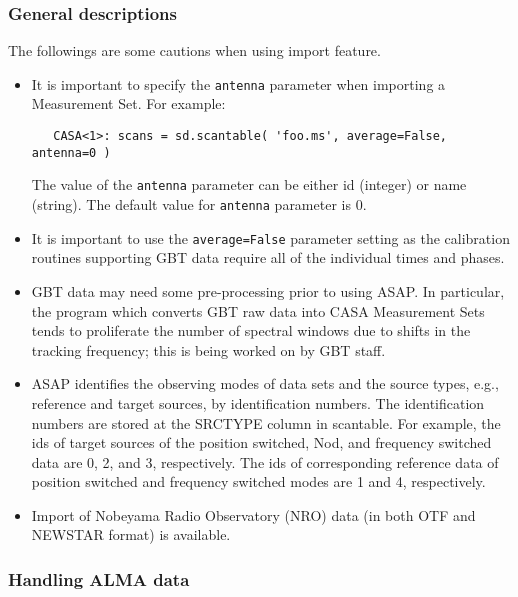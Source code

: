 \subsubsection{General descriptions}
\label{subsubsection:sd.asap.import.gen}

The followings are some cautions when using import feature.

\begin{itemize}

\item It is important to specify the {\tt antenna} parameter when importing a Measurement Set.
 For example:

\begin{verbatim}
   CASA<1>: scans = sd.scantable( 'foo.ms', average=False, antenna=0 )
\end{verbatim}
 
 The value of the {\tt antenna} parameter can be either id (integer) or name
 (string). The default value for {\tt antenna} parameter is 0.

\item It is important to use the {\tt average=False} parameter
setting as the calibration routines supporting GBT data require all of
the individual times and phases.

\item GBT data may need some pre-processing prior to using
ASAP. In particular, the program which converts GBT raw data into CASA
Measurement Sets tends to proliferate the number of spectral windows
due to shifts in the tracking frequency; this is being worked on by
GBT staff. 
\item  ASAP identifies the observing modes of data sets and 
the source types, e.g., reference and target sources, by 
identification numbers. The identification numbers are stored 
at the SRCTYPE column in scantable.
For example, the ids of target sources of the position switched, Nod,
and frequency switched data are 0, 2, and 3, respectively. 
The ids of corresponding reference data of position switched
and frequency switched modes are 1 and 4, respectively. 

\item  Import of Nobeyama Radio Observatory (NRO) data (in both OTF and NEWSTAR format)
 is available.
\end{itemize}

\subsubsection{Handling ALMA data}

